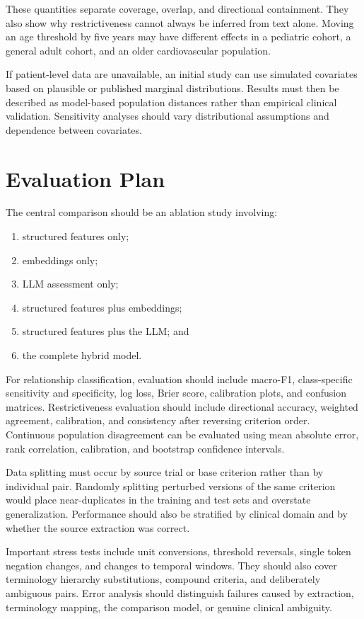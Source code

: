 \documentclass[11pt]{article}
\begin{document}
These quantities separate coverage, overlap, and directional containment. They also show why restrictiveness cannot always be inferred from text alone. Moving an age threshold by five years may have different effects in a pediatric cohort, a general adult cohort, and an older cardiovascular population.

If patient-level data are unavailable, an initial study can use simulated covariates based on plausible or published marginal distributions. Results must then be described as model-based population distances rather than empirical clinical validation. Sensitivity analyses should vary distributional assumptions and dependence between covariates.

\section{Evaluation Plan}

The central comparison should be an ablation study involving:

\begin{enumerate}
    \item structured features only;
    \item embeddings only;
    \item LLM assessment only;
    \item structured features plus embeddings;
    \item structured features plus the LLM; and
    \item the complete hybrid model.
\end{enumerate}

For relationship classification, evaluation should include macro-F1, class-specific sensitivity and specificity, log loss, Brier score, calibration plots, and confusion matrices. Restrictiveness evaluation should include directional accuracy, weighted agreement, calibration, and consistency after reversing criterion order. Continuous population disagreement can be evaluated using mean absolute error, rank correlation, calibration, and bootstrap confidence intervals.

Data splitting must occur by source trial or base criterion rather than by individual pair. Randomly splitting perturbed versions of the same criterion would place near-duplicates in the training and test sets and overstate generalization. Performance should also be stratified by clinical domain and by whether the source extraction was correct.

Important stress tests include unit conversions, threshold reversals, single token negation changes, and changes to temporal windows. They should also cover terminology hierarchy substitutions, compound criteria, and deliberately ambiguous pairs. Error analysis should distinguish failures caused by extraction, terminology mapping, the comparison model, or genuine clinical ambiguity.
\end{document}
